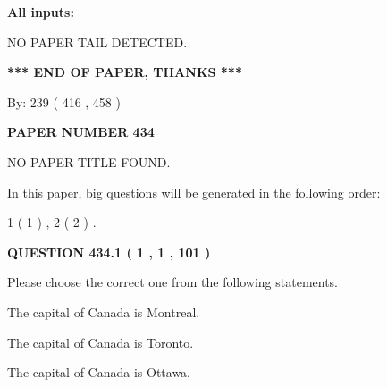 \documentclass[12pt]{article}
\begin{document}
   
   
   
\noindent{}
   
   
   
   
\noindent\vspace{0.1in}\hspace{-0.08in} {\textbf{\Large{All inputs: }}}
   
   
   
   
\vspace{2.0in} NO PAPER TAIL DETECTED.
   
   
   
   
\vspace{1.0in} 
{\textbf{\large{ *** END OF PAPER, THANKS *** }}} 
   
   
\hspace{1.0in} By: 
 239 ( 416 ,  458 )
   
   
   
   
\newpage 
\setcounter{page}{ 
   434001 } 
   
   
   
   
 {\textbf{ \Large{ PAPER NUMBER  434  }}}
   
   
\vspace{0.2in}
   
   
   
   
   
   
 NO PAPER TITLE FOUND.
   
   
   
\vspace{0.2in}
   
In this paper, big questions will be generated in the following order: 
   
   
   1 ( 1 )
 ,
   2 ( 2 )
 .
  
\vspace{0.2in}
  
{\textbf{\Large{QUESTION
434.1 
 ( 1 , 1 , 101 )
}}}
  
  
Please choose the correct one from the following statements.
 
 
The capital of Canada is Montreal.
 
 
The capital of Canada is Toronto.
 
 
The capital of Canada is Ottawa.
 
\end{document}
